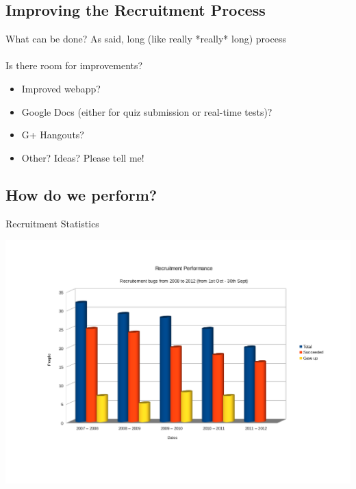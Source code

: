 \subsection{Improving the Recruitment Process}
\begin{frame}{What can be done?}
As said, long (like really *really* long) process
\\~\\
Is there room for improvements?
	\begin{itemize}
		\item Improved webapp?
	 	\item Google Docs (either for quiz submission or real-time tests)?
	 	\item G+ Hangouts?
	 	\item Other? Ideas? Please tell me!
	\end{itemize}
\end{frame}

\subsection{How do we perform?}
\begin{frame}{Recruitment Statistics}
	\begin{center}
	\includegraphics[scale=0.32]{recruitment_stats.png}
	\end{center}
\end{frame}

